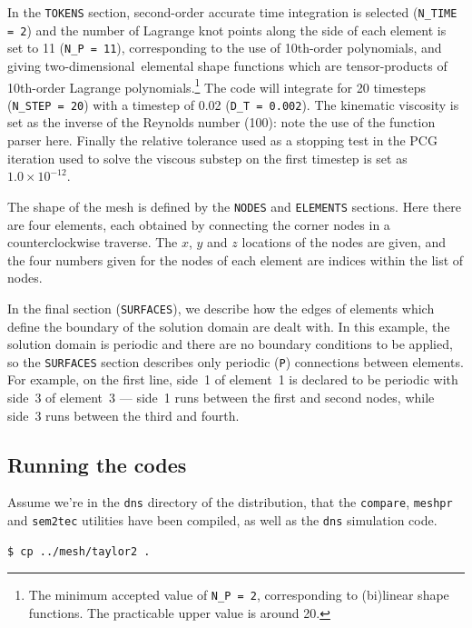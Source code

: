 \documentclass[11pt]{report}
\newcommand\twod{two-di\-men\-sion\-al}
\begin{document}
In the \texttt{TOKENS} section, second-order accurate time integration
is selected (\verb+N_TIME = 2+) and the number of Lagrange knot points
along the side of each element is set to 11 (\verb+N_P = 11+),
corresponding to the use of 10th-order polynomials, and giving
\twod\ elemental shape functions which are tensor-products of
10th-order Lagrange polynomials.\footnote{The minimum accepted value of
\texttt{N\_P = 2},
  corresponding to
  (bi)linear shape functions.  The practicable upper value is around 20.}
The code will integrate for 20 timesteps (\verb+N_STEP = 20+) with a
timestep of 0.02 (\verb+D_T = 0.002+).  The kinematic viscosity is set
as the inverse of the Reynolds number (100): note the use of the
function parser here.  Finally the relative tolerance used as a
stopping test in the PCG iteration used to solve the viscous substep
on the first timestep is set as $1.0\times10^{-12}$.

The shape of the mesh is defined by the \texttt{NODES} and
\texttt{ELEMENTS} sections.  Here there are four elements, each
obtained by connecting the corner nodes in a counterclockwise
traverse.  The $x$, $y$ and $z$ locations of the nodes are given, and
the four numbers given for the nodes of each element are indices
within the list of nodes.

In the final section (\texttt{SURFACES}), we describe how the edges of
elements which define the boundary of the solution domain are dealt
with.  In this example, the solution domain is periodic and there are
no boundary conditions to be applied, so the \texttt{SURFACES} section
describes only periodic (\verb+P+) connections between elements.  For
example, on the first line, side~1 of element~1 is declared to be
periodic with side~3 of element~3 --- side~1 runs between the first
and second nodes, while side~3 runs between the third and fourth.

\subsection{Running the codes}
\label{sec.taylor2drun}

Assume we're in the \texttt{dns} directory of the distribution, that
the \texttt{compare}, \texttt{meshpr} and
\texttt{sem2tec} utilities have been compiled, as well as the
\texttt{dns} simulation code.
{\small
\begin{verbatim}
$ cp ../mesh/taylor2 .
\end{verbatim}
}
\end{document}
